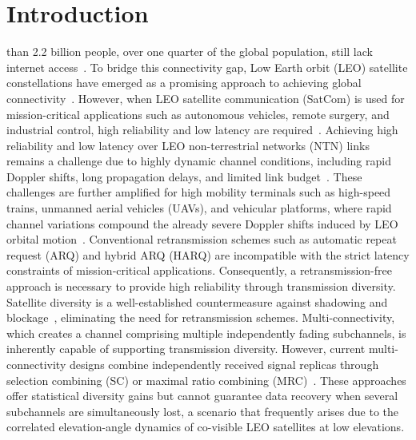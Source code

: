 \documentclass[journal]{IEEEtran}
\begin{document}
\section{Introduction}
\label{sec:introduction}
 than 2.2 billion people, over one quarter of the global population, still lack internet access~\cite{ITU2025Facts}. To bridge this connectivity gap, Low Earth orbit (LEO) satellite constellations have emerged as a promising approach to achieving global connectivity~\cite{Kodheli2021,3GPP38821,Lin2021,Luo24}. However, when LEO satellite communication (SatCom) is used for mission-critical applications such as autonomous vehicles, remote surgery, and industrial control, high reliability and low latency are required~\cite{Azari2022, Nguyen2024, Durisi2016, Basnayaka2026AoI}. Achieving high reliability and low latency over LEO non-terrestrial networks (NTN) links remains a challenge due to highly dynamic channel conditions, including rapid Doppler shifts, long propagation delays, and limited link budget~\cite{11240599}. These challenges are further amplified for high mobility terminals such as high-speed trains, unmanned aerial vehicles (UAVs), and vehicular platforms, where rapid channel variations compound the already severe Doppler shifts induced by LEO orbital motion~\cite{Li2021}. Conventional retransmission schemes such as automatic repeat request (ARQ) and hybrid ARQ (HARQ) are incompatible with the strict latency constraints of mission‑critical applications. Consequently, a retransmission-free approach is necessary to provide high reliability through transmission diversity. Satellite diversity is a well-established countermeasure against shadowing and blockage~\cite{Buzzi2023,596901,11299592,Wang2003}, eliminating the need for retransmission schemes. Multi-connectivity, which creates a channel comprising multiple independently fading subchannels, is inherently capable of supporting transmission diversity. However, current multi-connectivity designs combine independently received signal replicas through selection combining (SC) or maximal ratio combining (MRC)~\cite{li2024multiple}. These approaches offer statistical diversity gains but cannot guarantee data recovery when several subchannels are simultaneously lost, a scenario that frequently arises due to the correlated elevation-angle dynamics of co-visible LEO satellites at low elevations.
\end{document}
